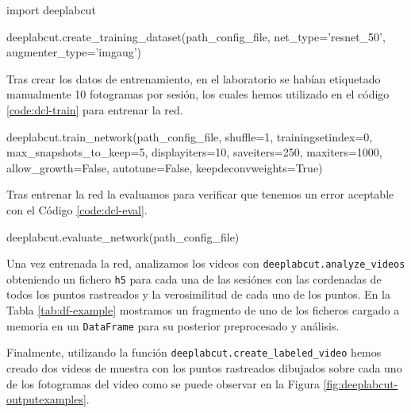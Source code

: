 \begin{mypython}[caption={Crear datos de entrenamiento de DeepLabCut.}, label={code:dcl-dataset}]
import deeplabcut

deeplabcut.create_training_dataset(path_config_file, 
                                   net_type='resnet_50',
                                   augmenter_type='imgaug')
\end{mypython}

Tras crear los datos de entrenamiento, en el laboratorio se habían etiquetado manualmente 10 fotogramas por sesión, los cuales hemos utilizado en el código \ref{code:dcl-train} para entrenar la red.

\begin{mypython}[caption={Entrenar la red de DeepLabCut.}, label={code:dcl-train}]
deeplabcut.train_network(path_config_file,
                         shuffle=1,
                         trainingsetindex=0,
                         max_snapshots_to_keep=5,
                         displayiters=10,
                         saveiters=250,
                         maxiters=1000,
                         allow_growth=False,
                         autotune=False,
                         keepdeconvweights=True)
\end{mypython}

Tras entrenar la red la evaluamos para verificar que tenemos un error aceptable con el Código \ref{code:dcl-eval}.

\begin{mypython}[caption={Evaluar la red de DeepLabCut.}, label={code:dcl-eval}]
deeplabcut.evaluate_network(path_config_file)
\end{mypython}

Una vez entrenada la red, analizamos los videos con \texttt{deeplabcut.analyze\_videos} obteniendo un fichero \texttt{h5} para cada una de las sesiónes con las cordenadas de todos los puntos rastreados y la verosimilitud de cada uno de los puntos. En la Tabla \ref{tab:df-example} mostramos un fragmento de uno de los ficheros cargado a memoria en un \texttt{DataFrame} para su posterior preprocesado y análisis.

Finalmente, utilizando la función \texttt{deeplabcut.create\_labeled\_video} hemos creado dos videos de muestra con los puntos rastreados dibujados sobre cada uno de los fotogramas del video como se puede observar en la Figura \ref{fig:deeplabcut-outputexamples}.

